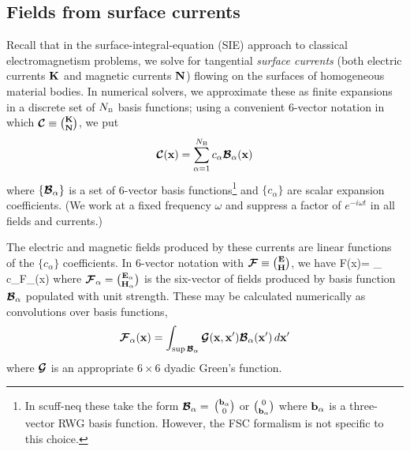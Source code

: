 \documentclass[letterpaper]{article}
\begin{document}
\subsection*{Fields from surface currents}

Recall that in the surface-integral-equation (SIE) approach to
classical electromagnetism problems, we solve for tangential
\textit{surface currents} (both electric currents $\mathbf{K}$ 
and magnetic currents $\mathbf{N}$) flowing on the surfaces of 
homogeneous material bodies. In numerical solvers, we 
approximate these as finite expansions in a discrete set
of $N_{\hbox{\tiny{B}}}$ basis functions; using a convenient 6-vector notation 
in which $\boldsymbol{\mathcal{C}}\equiv {\mathbf{K} \choose \mathbf{N}}$, we put
$$ \boldsymbol{\mathcal{C}}(\mathbf{x})=\sum_{\alpha=1}^{N_{\hbox{\tiny{B}}}} 
   c_\alpha \boldsymbol{\mathcal{B}}_\alpha(\mathbf{x}) 
$$ 
where $\{\boldsymbol{\mathcal{B}}_\alpha\}$ is a set of 6-vector basis 
functions\footnote{In {\sc scuff-neq} these take the form
$\boldsymbol{\mathcal{B}}_\alpha=$ 
$\mathbf{b}_\alpha \choose 0$ 
or 
$0 \choose \mathbf{b}_\alpha$
where $\mathbf{b}_\alpha$ is a three-vector RWG basis function.
However, the FSC formalism is not specific to this choice.}
and $\{c_\alpha\}$ are scalar expansion coefficients.
(We work at a fixed frequency $\omega$ and suppress a factor of
$e^{-i\omega t}$ in all fields and currents.)

The electric and magnetic fields produced by these currents
are linear functions of the $\{c_\alpha\}$ coefficients.
In 6-vector notation with $\boldsymbol{\mathcal{F}}\equiv {\mathbf{E} \choose \mathbf{H}}$, we have
{ \bmc F(\vb x)=
   \sum_{\alpha} c_\alpha \bmc F_\alpha(\vb x)
}
where $\boldsymbol{\mathcal{F}}_\alpha={\mathbf{E}_\alpha \choose \mathbf{H}_\alpha}$ 
is the six-vector of fields produced by basis function $\boldsymbol{\mathcal{B}}_\alpha$ 
populated with unit strength. These may be calculated numerically
as convolutions over basis functions,
$$ \boldsymbol{\mathcal{F}}_\alpha(\mathbf{x})
   =\int_{\sup \boldsymbol{\mathcal{B}}_\alpha} \boldsymbol{\mathcal{G}}(\mathbf{x}, \mathbf{x}^\prime)
    \boldsymbol{\mathcal{B}}_\alpha(\mathbf{x}^\prime) \, d\mathbf{x}^\prime
$$
where $\boldsymbol{\mathcal{G}}$ is an appropriate $6\times 6$ dyadic Green's
function.
\end{document}
